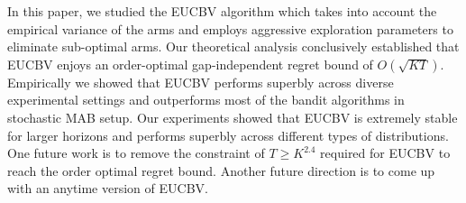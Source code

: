 In this paper, we studied the EUCBV algorithm which takes into account the empirical variance of the arms and employs aggressive exploration parameters to eliminate sub-optimal arms. Our theoretical analysis conclusively established that EUCBV enjoys an order-optimal gap-independent regret bound of $O\left(\sqrt{KT}\right)$. Empirically we showed that EUCBV performs superbly across diverse experimental settings and outperforms most of the bandit algorithms in stochastic  MAB setup. Our experiments showed that EUCBV is extremely stable for larger horizons and performs superbly  across different types of distributions. One future work is to remove the constraint of $T\geq K^{2.4}$ required for EUCBV to reach the order optimal regret bound. Another future direction is to come up with an anytime version of EUCBV. 